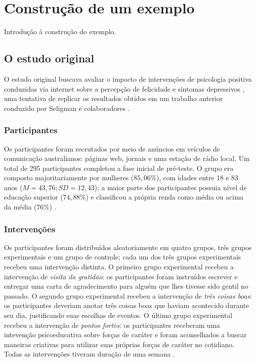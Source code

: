 \section{Construção de um exemplo}

Introdução à construção do exemplo.

\subsection{O estudo original}

O estudo original buscava avaliar o impacto de intervenções de psicologia positiva conduzidas via internet sobre a percepção de felicidade e
sintomas depressivos \cite{Woodworth2017}, uma tentativa de replicar os resultados obtidos em um trabalho anterior conduzido por Seligman e
colaboradores \cite{Seligman2005}.

\subsubsection{Participantes}

Os participantes foram recrutados por meio de anúncios em veículos de comunicação australianos: páginas web, jornais e uma estação de rádio
local. Um total de 295 participantes completou a fase inicial de pré-teste. O grupo era composto majoritariamente por mulheres ($85,06\%$),
com idades entre 18 e 83 anos ($M=43,76; SD=12,43$); a maior parte dos participantes possuia nível de educação superior ($74,88\%$) e classificou
a própria renda como média ou acima da média ($76\%$) \cite{Woodworth2017, Collins2023}.

\subsubsection{Intervenções}

Os participantes foram distribuídos aleatoriamente em quatro grupos, três grupos experimentais e um grupo de controle; cada um dos três grupos
experimentais recebeu uma intervenção distinta. O primeiro grupo experimental recebeu a intervenção de \emph{visita da gratidão}: os participantes
foram instruídos escrever e entregar uma carta de agradecimento para alguém que lhes tivesse sido gentil no passado. O segundo grupo experimental
recebeu a intervenção de \emph{três coisas boas}: os participantes deveriam anotar três coisas boas que haviam acontecido durante seu dia, justificando
suas escolhas de eventos. O último grupo experimental recebeu a intervenção de \emph{pontos fortes}: os participantes receberam uma intevenção
psicoeducativa sobre forças de caráter e foram aconselhados a buscar maneiras criativas para utilizar suas próprias forças de caráter no cotidiano.
Todas as intervenções tiveram duração de uma semana \cite{Woodworth2017}.

